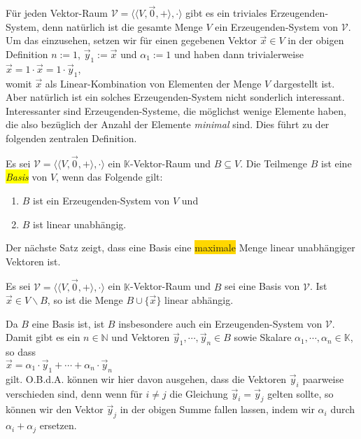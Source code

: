 F\"{u}r jeden Vektor-Raum $\mathcal{V} = \bigl\langle \langle V, \vec{0}, + \rangle, \cdot \bigr\rangle$ 
gibt es ein triviales Erzeugenden-System, denn nat\"{u}rlich ist die gesamte 
Menge $V$ ein Erzeugenden-System von $\mathcal{V}$.  Um das einzusehen, setzen wir f\"{u}r einen gegebenen Vektor
$\vec{x} \in V$ in der obigen Definition $n:=1$, $\vec{y}_1 := \vec{x}$ und $\alpha_1 := 1$
und haben dann trivialerweise
\\[0.2cm]
\hspace*{1.3cm}
$\vec{x} = 1 \cdot \vec{x} = 1 \cdot \vec{y}_1$,
\\[0.2cm]
womit $\vec{x}$ als Linear-Kombination von Elementen der Menge $V$ dargestellt ist.  Aber
nat\"{u}rlich ist ein solches Erzeugenden-System nicht sonderlich interessant.  Interessanter sind
Erzeugenden-Systeme, die m\"{o}glichst wenige Elemente haben, die also bez\"{u}glich der Anzahl
der Elemente \emph{minimal} sind.  Dies f\"{u}hrt zu der folgenden zentralen Definition.

\begin{Definition}[Basis]
  Es sei $\mathcal{V} = \bigl\langle \langle V, \vec{0}, + \rangle, \cdot \bigr\rangle$ ein $\mathbb{K}$-Vektor-Raum 
  und $B \subseteq V$.  Die Teilmenge $B$ ist eine
  \colorbox{yellow}{\emph{Basis}} von $V$, wenn das Folgende gilt:
  \begin{enumerate}
  \item $B$ ist ein Erzeugenden-System von $V$ und
  \item $B$ ist linear unabh\"{a}ngig.  \eoxs
  \end{enumerate}
\end{Definition}

\noindent
Der n\"{a}chste Satz zeigt, dass eine Basis eine \colorbox{gold}{maximale} Menge linear unabh\"{a}ngiger Vektoren ist.

\begin{Satz}
  Es sei $\mathcal{V} = \bigl\langle \langle V, \vec{0}, + \rangle, \cdot \bigr\rangle$ 
  ein $\mathbb{K}$-Vektor-Raum und $B$ sei eine Basis von $\mathcal{V}$.  Ist $\vec{x} \in V \backslash B$,
  so ist die Menge $B \cup \{ \vec{x} \}$ linear abh\"{a}ngig.
\end{Satz}

\proof
Da $B$ eine Basis ist, ist $B$ insbesondere auch ein Erzeugenden-System von $\mathcal{V}$.  Damit gibt es ein
$n \in \mathbb{N}$ und Vektoren $\vec{y}_1,\cdots,\vec{y}_n \in B$ sowie Skalare $\alpha_1, \cdots,\alpha_n \in \mathbb{K}$,
so dass
\\[0.2cm]
\hspace*{1.3cm}
$\vec{x} = \alpha_1 \cdot \vec{y}_1 + \cdots + \alpha_n \cdot \vec{y}_n$
\\[0.2cm]
gilt.  O.B.d.A. k\"{o}nnen wir hier davon ausgehen, dass die Vektoren $\vec{y}_i$ paarweise
verschieden sind, denn wenn f\"{u}r $i\not= j$ die Gleichung $\vec{y}_i = \vec{y}_j$
gelten sollte, so k\"{o}nnen wir den Vektor $\vec{y}_j$ in der obigen Summe fallen lassen,
indem wir $\alpha_i$ durch $\alpha_i + \alpha_j$ ersetzen.

